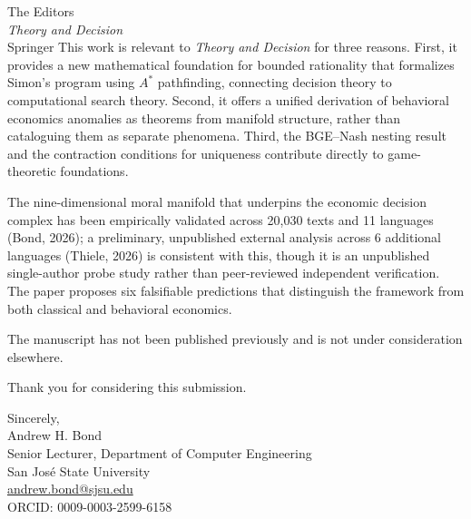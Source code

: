\documentclass[12pt]{letter}
\begin{document}
\begin{letter}{%
The Editors\\
\emph{Theory and Decision}\\
Springer}
This work is relevant to \emph{Theory and Decision} for three reasons.  First, it provides a new mathematical foundation for bounded rationality that formalizes Simon's program using $A^*$ pathfinding, connecting decision theory to computational search theory.  Second, it offers a unified derivation of behavioral economics anomalies as theorems from manifold structure, rather than cataloguing them as separate phenomena.  Third, the BGE--Nash nesting result and the contraction conditions for uniqueness contribute directly to game-theoretic foundations.

The nine-dimensional moral manifold that underpins the economic decision complex has been empirically validated across 20,030 texts and 11 languages (Bond, 2026); a preliminary, unpublished external analysis across 6 additional languages (Thiele, 2026) is consistent with this, though it is an unpublished single-author probe study rather than peer-reviewed independent verification.  The paper proposes six falsifiable predictions that distinguish the framework from both classical and behavioral economics.

The manuscript has not been published previously and is not under consideration elsewhere.

Thank you for considering this submission.

\closing{Sincerely,\\[2em]
Andrew H. Bond\\
Senior Lecturer, Department of Computer Engineering\\
San Jos\'{e} State University\\
\href{mailto:andrew.bond@sjsu.edu}{andrew.bond@sjsu.edu}\\
ORCID: 0009-0003-2599-6158}

\end{letter}
\end{document}
